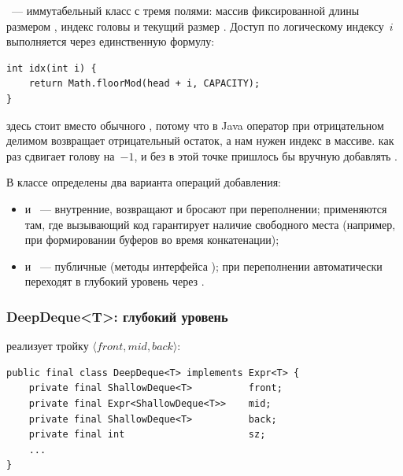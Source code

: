 ~--- иммутабельный класс с тремя полями:
массив фиксированной длины  размером ,
индекс головы  и текущий размер .
Доступ по логическому индексу~$i$ выполняется через единственную формулу:

\newpage
\begin{longlisting}
\caption{Циклическое индексирование в ShallowDeque}\label{lst:shallow-idx}
\begin{verbatim}
int idx(int i) {
    return Math.floorMod(head + i, CAPACITY);
}
\end{verbatim}
\end{longlisting}

 здесь стоит вместо обычного \prog{\%}, потому что в Java
оператор \prog{\%} при отрицательном делимом возвращает отрицательный
остаток, а нам нужен индекс в массиве.  как раз
сдвигает голову на~$-1$, и без  в этой точке пришлось бы
вручную добавлять .

В классе определены два варианта операций добавления:
\begin{itemize}
  \item {} и ~--- внутренние, возвращают
         и бросают  при переполнении;
        применяются там, где вызывающий код гарантирует наличие свободного места
        (например, при формировании буферов во время конкатенации);
  \item {} и ~--- публичные (методы
        интерфейса ); при переполнении автоматически переходят
        в глубокий уровень через .
\end{itemize}

\subsubsection{DeepDeque<T>: глубокий уровень}

 реализует тройку $\langle front, mid, back \rangle$:

\begin{longlisting}
\caption{Поля DeepDeque<T>}\label{lst:deep-fields}
\begin{verbatim}
public final class DeepDeque<T> implements Expr<T> {
    private final ShallowDeque<T>          front;
    private final Expr<ShallowDeque<T>>    mid;
    private final ShallowDeque<T>          back;
    private final int                      sz;
    ...
}
\end{verbatim}
\end{longlisting}

